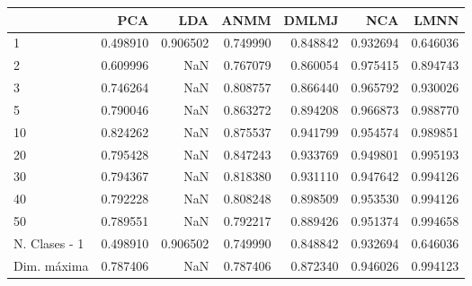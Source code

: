 \begin{tabular}{lrrrrrr}
\toprule
{} &       PCA &       LDA &      ANMM &     DMLMJ &       NCA &      LMNN \\
\midrule
1             &  0.498910 &  0.906502 &  0.749990 &  0.848842 &  0.932694 &  0.646036 \\
2             &  0.609996 &       NaN &  0.767079 &  0.860054 &  0.975415 &  0.894743 \\
3             &  0.746264 &       NaN &  0.808757 &  0.866440 &  0.965792 &  0.930026 \\
5             &  0.790046 &       NaN &  0.863272 &  0.894208 &  0.966873 &  0.988770 \\
10            &  0.824262 &       NaN &  0.875537 &  0.941799 &  0.954574 &  0.989851 \\
20            &  0.795428 &       NaN &  0.847243 &  0.933769 &  0.949801 &  0.995193 \\
30            &  0.794367 &       NaN &  0.818380 &  0.931110 &  0.947642 &  0.994126 \\
40            &  0.792228 &       NaN &  0.808248 &  0.898509 &  0.953530 &  0.994126 \\
50            &  0.789551 &       NaN &  0.792217 &  0.889426 &  0.951374 &  0.994658 \\
N. Clases - 1 &  0.498910 &  0.906502 &  0.749990 &  0.848842 &  0.932694 &  0.646036 \\
Dim. máxima   &  0.787406 &       NaN &  0.787406 &  0.872340 &  0.946026 &  0.994123 \\
\bottomrule
\end{tabular}
